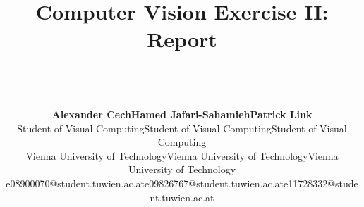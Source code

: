 \documentclass[a4paper,psfig,subfigure,epsfig,ausarbeitung,amssmb,float,caption,fontenc]{article}
\begin{document}
\date{}

\title{%
  \fontsize{14}{14pt} \bf Computer Vision Exercise II: Report}

\author{~\\
  ~\\
  \fontsize{12}{12pt}
  \begin{tabular}[t]{c c c}
  {\bf Alexander Cech}                    & {\bf Hamed Jafari-Sahamieh}             & {\bf Patrick Link}                      \\
  \small{Student of Visual Computing}     & \small{Student of Visual Computing}     & \small{Student of Visual Computing}     \\
  \small{Vienna University of Technology} & \small{Vienna University of Technology} & \small{Vienna University of Technology} \\
  \small{e08900070@student.tuwien.ac.at}  & \small{e09826767@student.tuwien.ac.at}  & \small{e11728332@student.tuwien.ac.at}  \\
  \end{tabular}
  ~\\ 
  \normalsize
  \normalsize
  }

\maketitle

\normalfont
\thispagestyle{empty}
\end{document}
